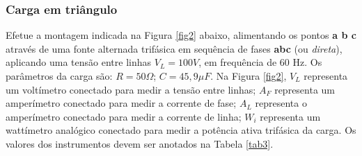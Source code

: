 \documentclass[a4paper,12pt,oneside,openany,table,xcdraw]{article}
\begin{document}
\begin{table}[H]\scriptsize
\centering
\def\arraystretch{1.35}
\captionsetup{font=scriptsize}
 \label{tab2}
\end{table}


\subsubsection{Carga em triângulo}
Efetue a montagem indicada na Figura \ref{fig2} abaixo, alimentando os pontos \textbf{a b c}
através de uma fonte alternada trifásica em sequência de fases \textbf{abc} (ou \textit{direta}),
aplicando uma tensão entre linhas $V_L = 100 V$, em frequência de 60 Hz. Os
parâmetros da carga são: $R = 50 \Omega$; $C = 45,9 \mu F$. Na Figura \ref{fig2}, $V_L$ representa um
voltímetro conectado para medir a tensão entre linhas; $A_F$ representa um amperímetro
conectado para medir a corrente de fase; $A_L$ representa o amperímetro conectado para
medir a corrente de linha; $W_i$ representa um wattímetro analógico conectado para medir
a potência ativa trifásica da carga. Os valores dos instrumentos devem ser anotados na
Tabela \ref{tab3}.
\end{document}
